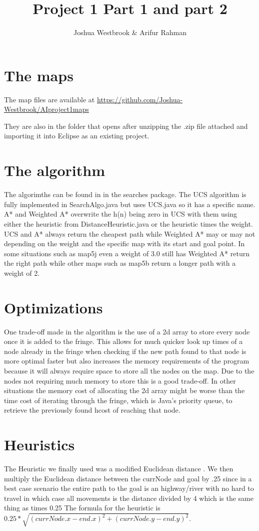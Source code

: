 \documentclass[11pt]{article} %
\title{Project 1 Part 1 and part 2}
\author{Joshua Westbrook \& Arifur Rahman}
\date{} %
\begin{document}
\maketitle

\section{The maps}

The map files are available at \url{https://github.com/Joshua-Westbrook/AIproject1maps}

They are also in the folder that opens after unzipping the .zip file attached and importing it into Eclipse as an existing project.

\section{The algorithm}

The algorimths can be found in in the searches package. The UCS algorithm is fully implemented in SearchAlgo.java but uses UCS.java so it has a specific name. A* and Weighted A* overwrite the h(n) being zero in UCS with them using either the heuristic from DistanceHeuristic.java or the heuristic times the weight. UCS and A* always return the cheapest path while Weighted A* may or may not depending on the weight and the specific map with its start and goal point. In some situations such as map5j even a weight of 3.0 still has Weighted A* return the right path while other maps such as map5b return a longer path with a weight of 2.


\section{Optimizations}
One trade-off made in the algorithm is the use of a 2d array to store every node once it is added to the fringe. This allows for much quicker look up times of a node already in the fringe when checking if the new path found to that node is more optimal faster but also increases the memory requirements of the program because it will always require space to store all the nodes on the map. Due to the nodes not requiring much memory to store this is a good trade-off. In other situations the memory cost of allocating the 2d array might be worse than the time cost of iterating through the fringe, which is Java's priority queue, to retrieve the previously found hcost of reaching that node. 	

\section{Heuristics}
The Heuristic we finally used was a modified Euclidean distance . We then multiply the Euclidean distance between the currNode and goal by .25 since in a best case scenario the entire path to the goal is an highway/river with no hard to travel in which case all movements is the distance divided by 4 which is the same thing as times 0.25
The formula for the heuristic is $0.25 * \sqrt{(currNode.x - end.x)^2 + (currNode.y - end.y)^2}$.
\end{document}
